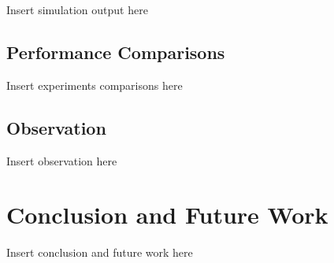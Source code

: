\documentclass[conference]{IEEEtran}
\begin{document}
Insert simulation output here


\subsection{Performance Comparisons}

Insert experiments comparisons here


\subsection{Observation}

Insert observation here



\section{Conclusion and Future Work}

Insert conclusion and future work here

\end{document}
